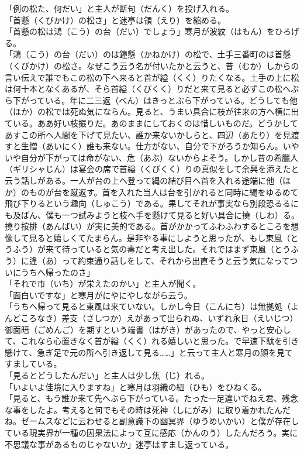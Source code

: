 \documentclass{book}
\begin{document}
「例の松た、何だい」と主人が断句（だんく）を投げ入れる。\\
「首懸（くびかけ）の松さ」と迷亭は領（えり）を縮める。\\
「首懸の松は鴻（こう）の台（だい）でしょう」寒月が波紋（はもん）をひろげる。\\
「鴻（こう）の台（だい）のは鐘懸（かねかけ）の松で、土手三番町のは首懸（くびかけ）の松さ。なぜこう云う名が付いたかと云うと、昔（むか）しからの言い伝えで誰でもこの松の下へ来ると首が縊（くく）りたくなる。土手の上に松は何十本となくあるが、そら首縊（くびくく）りだと来て見ると必ずこの松へぶら下がっている。年に二三返（べん）はきっとぶら下がっている。どうしても他（ほか）の松では死ぬ気にならん。見ると、うまい具合に枝が往来の方へ横に出ている。ああ好い枝振りだ。あのままにしておくのは惜しいものだ。どうかしてあすこの所へ人間を下げて見たい、誰か来ないかしらと、四辺（あたり）を見渡すと生憎（あいにく）誰も来ない。仕方がない、自分で下がろうか知らん。いやいや自分が下がっては命がない、危（あぶ）ないからよそう。しかし昔の希臘人（ギリシャじん）は宴会の席で首縊（くびくく）りの真似をして余興を添えたと云う話しがある。一人が台の上へ登って縄の結び目へ首を入れる途端に他（ほか）のものが台を蹴返す。首を入れた当人は台を引かれると同時に縄をゆるめて飛び下りるという趣向（しゅこう）である。果してそれが事実なら別段恐るるにも及ばん、僕も一つ試みようと枝へ手を懸けて見ると好い具合に撓（しわ）る。撓り按排（あんばい）が実に美的である。首がかかってふわふわするところを想像して見ると嬉しくてたまらん。是非やる事にしようと思ったが、もし東風（とうふう）が来て待っていると気の毒だと考え出した。それではまず東風（とうふう）に逢（あ）って約束通り話しをして、それから出直そうと云う気になってついにうちへ帰ったのさ」\\
「それで市（いち）が栄えたのかい」と主人が聞く。\\
「面白いですな」と寒月がにやにやしながら云う。\\
「うちへ帰って見ると東風は来ていない。しかし今日（こんにち）は無拠処（よんどころなき）差支（さしつか）えがあって出られぬ、いずれ永日（えいじつ）御面晤（ごめんご）を期すという端書（はがき）があったので、やっと安心して、これなら心置きなく首が縊（くく）れる嬉しいと思った。で早速下駄を引き懸けて、急ぎ足で元の所へ引き返して見る\ldots{}\ldots{}」と云って主人と寒月の顔を見てすましている。\\
「見るとどうしたんだい」と主人は少し焦（じ）れる。\\
「いよいよ佳境に入りますね」と寒月は羽織の紐（ひも）をひねくる。\\
「見ると、もう誰か来て先へぶら下がっている。たった一足違いでねえ君、残念な事をしたよ。考えると何でもその時は死神（しにがみ）に取り着かれたんだね。ゼームスなどに云わせると副意識下の幽冥界（ゆうめいかい）と僕が存在している現実界が一種の因果法によって互に感応（かんのう）したんだろう。実に不思議な事があるものじゃないか」迷亭はすまし返っている。\\
\end{document}

